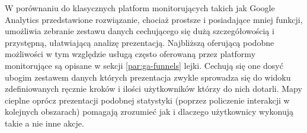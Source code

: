 W porównaniu do klasycznych platform monitorujących takich jak Google Analytics przedstawione rozwiązanie, chociaż prostsze i posiadające mniej funkcji, umożliwia zebranie zestawu danych cechującego się dużą szczegółowością i przystępną, ułatwiającą analizę prezentacją. Najbliższą oferującą podobne możliwości w tym względzie usługą często oferowaną przez platformy monitorujące są opisane w sekcji \ref{par:ga-funnels} lejki. Cechują się one dosyć  ubogim zestawem danych których prezentacja zwykle sprowadza się do widoku zdefiniowanych ręcznie kroków i ilości użytkowników którzy do nich dotarli. Mapy cieplne oprócz prezentacji podobnej statystyki (poprzez policzenie interakcji w kolejnych obszarach) pomagają zrozumieć jak i dlaczego użytkownicy wykonują takie a nie inne akcje.

